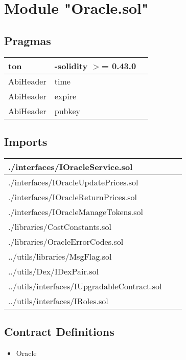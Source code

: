 
\section{Module "Oracle.sol"}


\subsection{Pragmas}


\noindent\begin{tabular}{|l|l|p{5cm}|}\hline
ton & -solidity $>$= 0.43.0 &\\\hline
AbiHeader &  time &\\\hline
AbiHeader &  expire &\\\hline
AbiHeader &  pubkey &\\\hline
\end{tabular}


\subsection{Imports}


\noindent\begin{tabular}{|l|l|p{5cm}|}\hline
./interfaces/IOracleService.sol &\\\hline
./interfaces/IOracleUpdatePrices.sol &\\\hline
./interfaces/IOracleReturnPrices.sol &\\\hline
./interfaces/IOracleManageTokens.sol &\\\hline
./libraries/CostConstants.sol &\\\hline
./libraries/OracleErrorCodes.sol &\\\hline
../utils/libraries/MsgFlag.sol &\\\hline
../utils/Dex/IDexPair.sol &\\\hline
../utils/interfaces/IUpgradableContract.sol &\\\hline
../utils/interfaces/IRoles.sol &\\\hline
\end{tabular}


\subsection{Contract Definitions}

\begin{itemize}
\item Oracle
\end{itemize}
